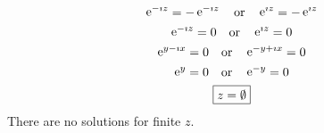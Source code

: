 {\begin{Solution}
\begin{enumerate}
\begin{gather*}
      \mathop{\mathrm{e}}\nolimits^{-\imath z} = - \mathop{\mathrm{e}}\nolimits^{-\imath z} \quad \mathrm{or} \quad \mathop{\mathrm{e}}\nolimits^{\imath z} = - \mathop{\mathrm{e}}\nolimits^{\imath z} 
      \\
      \mathop{\mathrm{e}}\nolimits^{-\imath z} = 0 \quad \mathrm{or} \quad \mathop{\mathrm{e}}\nolimits^{\imath z} = 0 
      \\
      \mathop{\mathrm{e}}\nolimits^{y - \imath x} = 0 \quad \mathrm{or} \quad \mathop{\mathrm{e}}\nolimits^{-y + \imath x} = 0 
      \\
      \mathop{\mathrm{e}}\nolimits^y = 0 \quad \mathrm{or} \quad \mathop{\mathrm{e}}\nolimits^{-y} = 0 
      \\
      \boxed{
        z = \emptyset
        }
    \end{gather*}
    There are no solutions for finite $z$.
  \end{enumerate}
\end{Solution}
}




